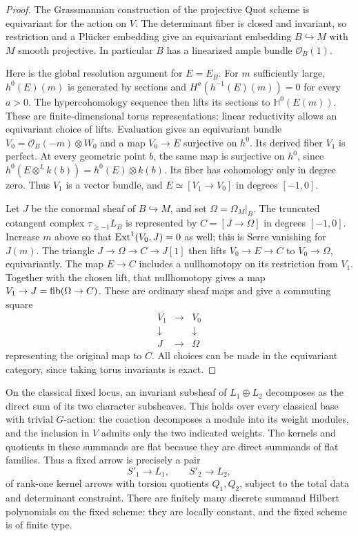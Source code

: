 \begin{proof}
The Grassmannian construction of the projective Quot scheme is
equivariant for the action on $V$.  The determinant fiber is closed and
invariant, so restriction and a Pl\"ucker embedding give an equivariant
embedding $B\hookrightarrow M$ with $M$ smooth projective.  In particular
$B$ has a linearized ample bundle $\mathcal O_B(1)$.

Here is the global resolution argument for $E=E_B$.  For $m$ sufficiently
large, $h^0(E)(m)$ is generated by sections and
$H^a(h^{-1}(E)(m))=0$ for every $a>0$.  The hypercohomology sequence then lifts its
sections to $\mathbb H^0(E(m))$.  These are finite-dimensional torus
representations; linear reductivity allows an equivariant choice of
lifts.  Evaluation gives an equivariant bundle
$V_0=\mathcal O_B(-m)\otimes W_0$ and a map $V_0\to E$ surjective on
$h^0$.  Its derived fiber $V_1$ is perfect.  At every geometric point
$b$, the same map is surjective on $h^0$, since
$h^0(E\otimes^L k(b))=h^0(E)\otimes k(b)$.  Its fiber has cohomology
only in degree zero.  Thus $V_1$ is a vector bundle, and
$E\simeq[V_1\to V_0]$ in degrees $[-1,0]$.

Let $J$ be the conormal sheaf of $B\hookrightarrow M$, and set
$\Omega=\Omega_M|_B$.  The truncated cotangent complex
$\tau_{\geq-1}L_B$ is represented by $C=[J\to\Omega]$ in degrees
$[-1,0]$.  Increase $m$ above so that
$\operatorname{Ext}^1(V_0,J)=0$ as well; this is Serre vanishing for $J(m)$.
The triangle $J\to\Omega\to C\to J[1]$ then lifts
$V_0\to E\to C$ to $V_0\to\Omega$, equivariantly.  The map
$E\to C$ includes a nullhomotopy on its restriction from $V_1$.
Together with the chosen lift, that nullhomotopy gives a map
$V_1\to J=\operatorname{fib}(\Omega\to C)$.  These are ordinary sheaf maps and give
a commuting square
\[
\begin{array}{ccc}
V_1&\longrightarrow&V_0\\
\downarrow&&\downarrow\\
J&\longrightarrow&\Omega
\end{array}
\]
representing the original map to $C$.  All choices can be made in the
equivariant category, since taking torus invariants is exact.
\end{proof}

On the classical fixed locus, an invariant subsheaf of
$L_1\oplus L_2$ decomposes as the direct sum of its two character
subsheaves.  This holds over every classical base with trivial
$G$-action: the coaction decomposes a module into its weight modules,
and the inclusion in $V$ admits only the two indicated weights.
The kernels and quotients in these summands are flat because they are
direct summands of flat families.  Thus a fixed arrow is precisely a pair
\[
S'_1\longrightarrow L_1,\qquad S'_2\longrightarrow L_2,
\]
of rank-one kernel arrows with torsion quotients $Q_1,Q_2$, subject to
the total data and determinant constraint.  There are finitely many
discrete summand Hilbert polynomials on the fixed scheme: they are
locally constant, and the fixed scheme is of finite type.

